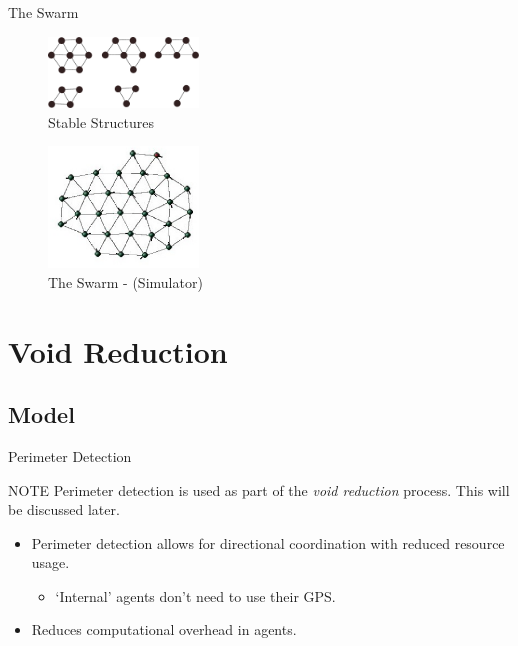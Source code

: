 \documentclass{beamer}
\begin{document}
\begin{frame}{The Swarm}
  \begin{figure}
    \begin{center}
      \includegraphics[width=4cm]{StableForms.pdf}
    \end{center}
    \caption{Stable Structures}
  \end{figure}
  \begin{figure}
    \begin{center}
      \includegraphics[width=4cm]{Stable.eps}
    \end{center}
    \caption{The Swarm - (Simulator)}
  \end{figure}
\end{frame}

\section{Void Reduction}

\subsection{Model}

\begin{frame}{Perimeter Detection}
  \begin{block}{NOTE}
    Perimeter detection is used as part of the \textit{void reduction} process. This will be discussed later. 
  \end{block}
  \begin{itemize}
    \item Perimeter detection allows for directional coordination with reduced resource usage.
      \begin{itemize}
        \item `Internal' agents don't need to use their GPS.
      \end{itemize}
    \item Reduces computational overhead in agents.
  \end{itemize}
\end{frame}
\end{document}
